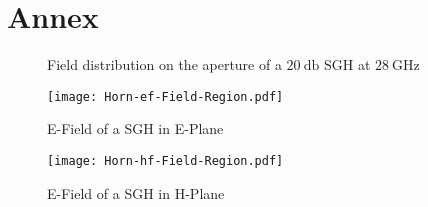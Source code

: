\chapter{Annex}

\begin{figure}
\centering
  \centering
  \centering
\caption{Field distribution on the aperture of a $\SI{20}{\decibel}$ \ac{SGH} at $\SI{28}{\giga\hertz}$}
\label{fig:fielddist}
\end{figure}

\begin{figure}
\centering
\texttt{[image: Horn-ef-Field-Region.pdf]}
\caption{E-Field of a \ac{SGH} in E-Plane}
\label{fig:eplaneef}
\end{figure}
\begin{figure}
\centering
\texttt{[image: Horn-hf-Field-Region.pdf]}
\caption{E-Field of a \ac{SGH} in H-Plane}
\label{fig:eplaneef}
\end{figure}